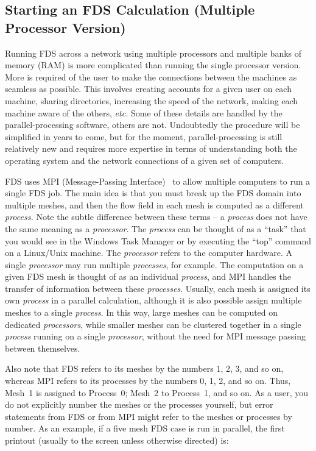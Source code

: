 \documentclass[11pt]{book}
\begin{document}
\subsection{Starting an FDS Calculation (Multiple Processor Version)}
\label{info:parallelprocessing}

Running FDS across a network using multiple processors and multiple
banks of memory (RAM) is more complicated than running the single
processor version.  More is required of the user to make the
connections between the machines as seamless as possible. This
involves creating accounts for a given user on each machine, sharing
directories, increasing the speed of the network, making each machine
aware of the others, {\em etc.}  Some of these details are handled by
the parallel-processing software, others are not. Undoubtedly the
procedure will be simplified in years to come, but for the moment,
parallel-processing is still relatively new and requires more
expertise in terms of understanding both the operating system and the
network connections of a given set of computers.

FDS uses MPI (Message-Passing Interface)~\cite{Gropp:1} to allow
multiple computers to run a single FDS job. The main idea is that you must break up the FDS domain into multiple meshes, and then
the flow field in each mesh is computed as a different {\em process.}
Note the subtle difference between these
terms -- a {\em process} does not have the same meaning as a {\em processor}.
The {\em process} can be thought of as a ``task'' that you would see in
the Windows Task Manager or by executing the ``top'' command on a Linux/Unix machine. The {\em processor} refers to the
computer hardware. A single
{\em processor} may run multiple {\em processes}, for example.
The computation on a given FDS mesh is thought of as an individual {\em process}, and
MPI handles the transfer of information between these {\em processes}.
Usually, each mesh is assigned its own {\em process} in a parallel calculation,
although it is also possible
assign multiple meshes to a single {\em process}.
In this way, large meshes can be computed on dedicated {\em processors}, while
smaller meshes can be clustered together in a single {\em process} running on a single {\em processor},
without the need for MPI message passing between themselves.

Also note that FDS refers to its meshes by the numbers 1, 2, 3, and so on, whereas MPI refers to its processes by the numbers
0, 1, 2, and so on. Thus, Mesh~1 is assigned to Process~0; Mesh~2 to Process~1, and so on.
As a user, you do not explicitly number the meshes or the processes yourself, but
error statements from FDS or from MPI might refer to the meshes or processes by number.
As an example, if a five mesh FDS case is run in parallel, the first printout (usually to the screen unless
otherwise directed) is:
\end{document}
